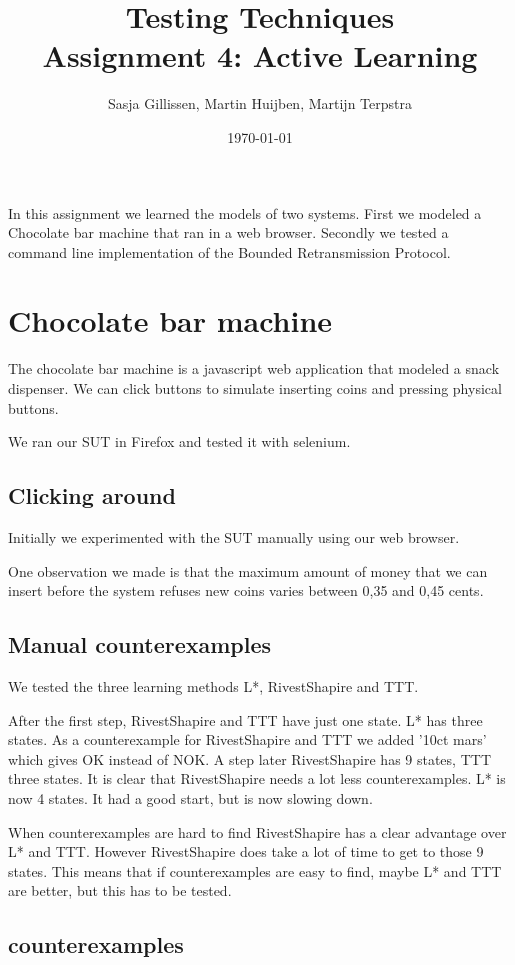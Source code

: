 \documentclass[11pt,a4paper]{article}
\author{Sasja Gillissen, Martin Huijben, Martijn Terpstra}
\date{\today}
\title{Testing Techniques\\
  \textbf{Assignment 4: Active Learning}}
\begin{document}
\maketitle

In this assignment we learned the models of two systems. First we
modeled a Chocolate bar machine that ran in a web browser. Secondly we
tested a command line implementation of the Bounded Retransmission Protocol.

\section{Chocolate bar machine}
The chocolate bar machine is a javascript web application that modeled
a snack dispenser. We can click buttons to simulate inserting coins
and pressing physical buttons.

We ran our SUT in Firefox and tested it with selenium.

\subsection{Clicking around}
Initially we experimented with the SUT manually using our web browser.

One observation we made is that the maximum amount of money that we
can insert before the system refuses new coins varies between 0,35 and
0,45 cents.

\subsection{Manual counterexamples}
We tested the three learning methods L*, RivestShapire and TTT.

After the first step, RivestShapire and TTT have just one state. L*
has three states. As a counterexample for RivestShapire and TTT we
added '10ct mars' which gives OK instead of NOK. A step later
RivestShapire has 9 states, TTT three states. It is clear that
RivestShapire needs a lot less counterexamples. L* is now 4 states. It
had a good start, but is now slowing down.

When counterexamples are hard to find RivestShapire has a clear
advantage over L* and TTT. However RivestShapire does take a lot of
time to get to those 9 states. This means that if counterexamples are
easy to find, maybe L* and TTT are better, but this has to be tested.


\subsection{counterexamples}
\end{document}
